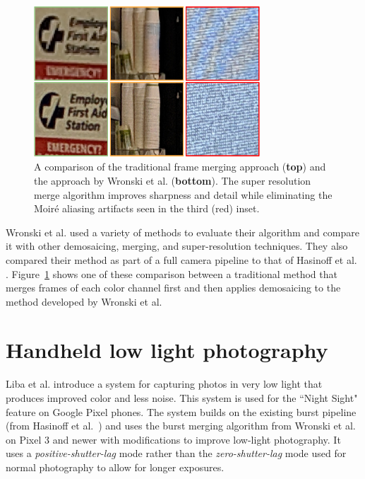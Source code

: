 \documentclass{sig-alternate}
\begin{document}
\begin{figure}[]
\centering
\includegraphics[width=20pc]{figures/wronski2019-figure-1-100quality-crop.jpg}

\caption{A comparison of the traditional frame merging approach (\textbf{top}) and the approach by Wronski et al. (\textbf{bottom}). The super resolution merge algorithm improves sharpness and detail while eliminating the 
Moiré aliasing artifacts seen in the third (red) inset.~\cite{Wronski2019}}


\label{fig:wronskiResults}
\end{figure}

Wronski et al. used a variety of methods to evaluate their algorithm and compare it with other demosaicing, merging, and super-resolution techniques. They also compared their method as part of a full camera pipeline to that of Hasinoff et al. \cite{Hasinoff2016}. Figure~\ref{fig:wronskiResults} shows one of these comparison between a traditional method that merges frames of each color channel first and then applies demosaicing to the method developed by Wronski et al. \cite{Wronski2019}


\section{Handheld low light photography}
\label{sec:handheldLowLight}

Liba et al. \cite{Liba2019} introduce a system for capturing photos in very low light that produces improved color and less noise. This system is used for the ``Night Sight" feature on Google Pixel phones.
The system builds on the existing burst pipeline (from Hasinoff et al.~\cite{Hasinoff2016}) and uses the burst merging algorithm from Wronski et al.~\cite{Wronski2019} on Pixel 3 and newer with modifications to improve low-light photography. It uses a \emph{positive-shutter-lag} mode rather than the \emph{zero-shutter-lag} mode used for normal photography to allow for longer exposures.
\end{document}

